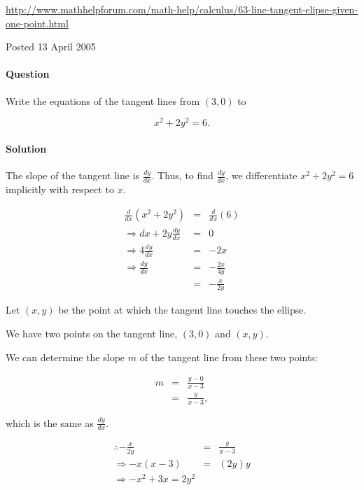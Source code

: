 \url{http://www.mathhelpforum.com/math-help/calculus/63-line-tangent-elipse-given-one-point.html}

Posted 13 April 2005

\paragraph{Question} Write the equations of the tangent lines from $\left(3,0\right)$ to

\begin{equation}
	x^2+2y^2=6.\label{63a}
\end{equation}

\paragraph{Solution} 

The slope of the tangent line is $\frac{dy}{dx}$. Thus, to find $\frac{dy}{dx}$, we differentiate $x^2+2y^2=6$ implicitly with respect to $x$.

\begin{eqnarray*}
	\frac{d}{dx}\left(x^2+2y^2\right)&=&\frac{d}{dx}\left(6\right)\\
	\Rightarrow dx+2y\frac{dy}{dx}&=&0\\
	\Rightarrow 4\frac{dy}{dx}&=&-2x\\
	\Rightarrow \frac{dy}{dx}&=&-\frac{2x}{4y}\\
	&=&-\frac{x}{2y}
\end{eqnarray*}

Let $\left(x,y\right)$ be the point at which the tangent line touches the ellipse.

We have two points on the tangent line, $\left(3,0\right)$ and $\left(x,y\right)$.

We can determine the slope $m$ of the tangent line from these two points:

\begin{eqnarray*}
	m&=&\frac{y-0}{x-3}\\
	&=&\frac{y}{x-3},
\end{eqnarray*}

which is the same as $\frac{dy}{dx}$.

\begin{eqnarray}
	\therefore-\frac{x}{2y}&=&\frac{y}{x-3}\nonumber\\
	\Rightarrow-x\left(x-3\right)&=&\left(2y\right)y\nonumber\\
	\Rightarrow-x^2+3x=2y^2\label{63b}
\end{eqnarray}

